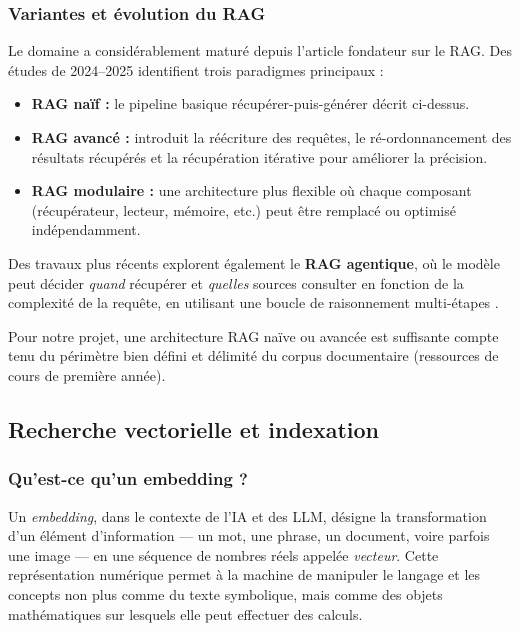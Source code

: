 \documentclass[a4paper,11pt]{article}
\begin{document}
\subsubsection{Variantes et évolution du RAG}

Le domaine a considérablement maturé depuis l'article fondateur sur le RAG.
Des études de 2024--2025 identifient trois paradigmes principaux
\cite{gao2024rag} :

\begin{itemize}
  \item \textbf{RAG naïf :} le pipeline basique récupérer-puis-générer
    décrit ci-dessus.
  \item \textbf{RAG avancé :} introduit la réécriture des requêtes, le
    ré-ordonnancement des résultats récupérés et la récupération itérative
    pour améliorer la précision.
  \item \textbf{RAG modulaire :} une architecture plus flexible où chaque
    composant (récupérateur, lecteur, mémoire, etc.) peut être remplacé
    ou optimisé indépendamment.
\end{itemize}

Des travaux plus récents explorent également le \textbf{RAG agentique},
où le modèle peut décider \emph{quand} récupérer et \emph{quelles} sources
consulter en fonction de la complexité de la requête, en utilisant une
boucle de raisonnement multi-étapes \cite{zhao2024rag}.

Pour notre projet, une architecture RAG naïve ou avancée est suffisante
compte tenu du périmètre bien défini et délimité du corpus documentaire
(ressources de cours de première année).

\subsection{Recherche vectorielle et indexation}

\subsubsection{Qu'est-ce qu'un embedding ?}

Un \emph{embedding}, dans le contexte de l'IA et des LLM, désigne la
transformation d'un élément d'information --- un mot, une phrase, un
document, voire parfois une image --- en une séquence de nombres réels
appelée \emph{vecteur}. Cette représentation numérique permet à la machine
de manipuler le langage et les concepts non plus comme du texte symbolique,
mais comme des objets mathématiques sur lesquels elle peut effectuer des
calculs.
\end{document}
